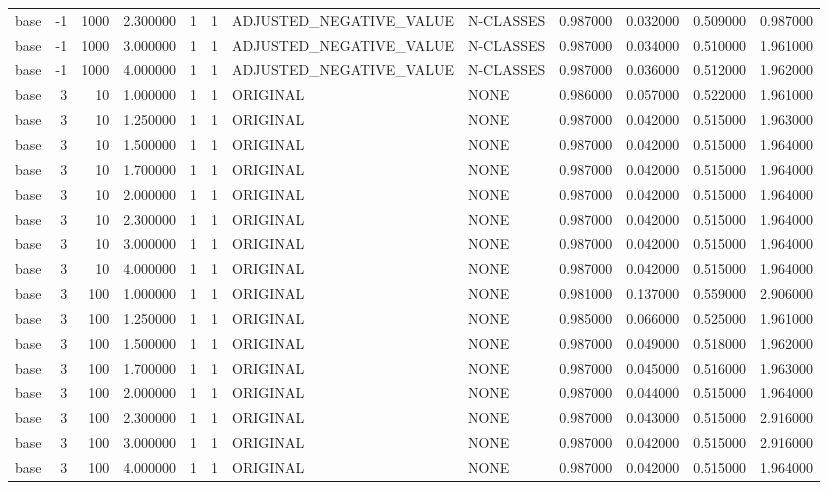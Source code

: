 \begin{tabular}{lrrrllllrrrr}
base & -1 & 1000 & 2.300000 & 1 & 1 & ADJUSTED_NEGATIVE_VALUE & N-CLASSES & 0.987000 & 0.032000 & 0.509000 & 0.987000 \\
base & -1 & 1000 & 3.000000 & 1 & 1 & ADJUSTED_NEGATIVE_VALUE & N-CLASSES & 0.987000 & 0.034000 & 0.510000 & 1.961000 \\
base & -1 & 1000 & 4.000000 & 1 & 1 & ADJUSTED_NEGATIVE_VALUE & N-CLASSES & 0.987000 & 0.036000 & 0.512000 & 1.962000 \\
base & 3 & 10 & 1.000000 & 1 & 1 & ORIGINAL & NONE & 0.986000 & 0.057000 & 0.522000 & 1.961000 \\
base & 3 & 10 & 1.250000 & 1 & 1 & ORIGINAL & NONE & 0.987000 & 0.042000 & 0.515000 & 1.963000 \\
base & 3 & 10 & 1.500000 & 1 & 1 & ORIGINAL & NONE & 0.987000 & 0.042000 & 0.515000 & 1.964000 \\
base & 3 & 10 & 1.700000 & 1 & 1 & ORIGINAL & NONE & 0.987000 & 0.042000 & 0.515000 & 1.964000 \\
base & 3 & 10 & 2.000000 & 1 & 1 & ORIGINAL & NONE & 0.987000 & 0.042000 & 0.515000 & 1.964000 \\
base & 3 & 10 & 2.300000 & 1 & 1 & ORIGINAL & NONE & 0.987000 & 0.042000 & 0.515000 & 1.964000 \\
base & 3 & 10 & 3.000000 & 1 & 1 & ORIGINAL & NONE & 0.987000 & 0.042000 & 0.515000 & 1.964000 \\
base & 3 & 10 & 4.000000 & 1 & 1 & ORIGINAL & NONE & 0.987000 & 0.042000 & 0.515000 & 1.964000 \\
base & 3 & 100 & 1.000000 & 1 & 1 & ORIGINAL & NONE & 0.981000 & 0.137000 & 0.559000 & 2.906000 \\
base & 3 & 100 & 1.250000 & 1 & 1 & ORIGINAL & NONE & 0.985000 & 0.066000 & 0.525000 & 1.961000 \\
base & 3 & 100 & 1.500000 & 1 & 1 & ORIGINAL & NONE & 0.987000 & 0.049000 & 0.518000 & 1.962000 \\
base & 3 & 100 & 1.700000 & 1 & 1 & ORIGINAL & NONE & 0.987000 & 0.045000 & 0.516000 & 1.963000 \\
base & 3 & 100 & 2.000000 & 1 & 1 & ORIGINAL & NONE & 0.987000 & 0.044000 & 0.515000 & 1.964000 \\
base & 3 & 100 & 2.300000 & 1 & 1 & ORIGINAL & NONE & 0.987000 & 0.043000 & 0.515000 & 2.916000 \\
base & 3 & 100 & 3.000000 & 1 & 1 & ORIGINAL & NONE & 0.987000 & 0.042000 & 0.515000 & 2.916000 \\
base & 3 & 100 & 4.000000 & 1 & 1 & ORIGINAL & NONE & 0.987000 & 0.042000 & 0.515000 & 1.964000 \\

\end{tabular}
